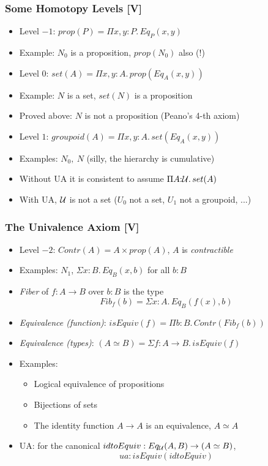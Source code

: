 \documentclass[handout]{beamer}
\newcommand{\depi}[3]{\Pi{#1{:}#2.\,#3}}
\newcommand{\sigm}[3]{\Sigma{#1{:}#2.\,#3}}
\newcommand{\UU}{{\cal U}}
\begin{document}
 \frame
  {

    \frametitle{Some Homotopy Levels [V]}

    \begin{itemize}[<+->]
    \item Level $-1$: $prop(P) = \depi{x,y}{P}{Eq_P(x,y)}$
    \item Example: $N_0$ is a proposition, $prop(N_0)$ also (!)
    \item Level $0$: $set(A) = \depi{x,y}{A}{prop(Eq_A(x,y))}$
    \item Example: $N$ is a set, $set(N)$ is a proposition
    \item Proved above: $N$ is not a proposition (Peano's 4-th axiom)
    \item Level $1$: $groupoid(A) = \depi{x,y}{A}{set(Eq_A(x,y))}$
    \item Examples: $N_0,~N$ (silly, the hierarchy is cumulative)
    \item Without UA it is consistent to assume $\depi{A}{\UU}{set(A)}$
    \item With UA, $\UU$ is not a set ($U_0$ not a set, $U_1$ not a groupoid, ...)
    \end{itemize}
  }

 \frame
  {

    \frametitle{The Univalence Axiom [V]}

    \begin{itemize}[<+->]
    \item Level $-2$: $Contr(A) = A \times prop(A)$, $A$ is \emph{contractible}
    \item Examples: $N_1$, $\sigm{x}{B}{Eq_B(x,b)}$ for all $b:B$
    \item \emph{Fiber} of $f:A\to B$ over $b:B$ is the type
    \[Fib_f (b) = \sigm{x}{A}{Eq_B(f(x),b)}\]
    \item \emph{Equivalence (function)}: $isEquiv(f) = \depi{b}{B}{Contr(Fib_f (b))}$
    \item \emph{Equivalence (types)}:
    $(A\simeq B) = \sigm{f}{A\to B}{isEquiv(f)}$
    \item Examples:
      \begin{itemize}[<+->]
      \item Logical equivalence of propositions
      \item Bijections of sets
      \item The identity function $A\to A$ is an equivalence, $A\simeq A$
      \end{itemize}
    \item UA:  for the canonical $idtoEquiv: Eq_{\UU}(A,B) \to (A\simeq B)$,
                                    \[ua : isEquiv(idtoEquiv)\]
    \end{itemize}
  }
\end{document}
